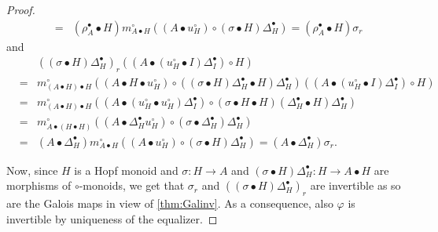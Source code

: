 \documentclass[nosumlimits,twoside]{amsart}
\theoremstyle{definition}
\theoremstyle{remark}
\begin{document}
\begin{proof}
\begin{eqnarray*}
&=&\left( \rho _{A}^{\bullet }\bullet H\right) m_{A\bullet H}^{\circ }\left(
\left( A\bullet u_{H}^{\circ }\right) \circ \left( \sigma \bullet H\right)
\Delta _{H}^{\bullet }\right)  =\left( \rho _{A}^{\bullet }\bullet H\right) \sigma _{r}
\end{eqnarray*}%
and
\begin{eqnarray*}
&&\left( \left( \sigma \bullet H\right) \Delta _{H}^{\bullet }\right)
_{r}\left( \left( A\bullet \left( u_{H}^{\circ }\bullet I\right) \Delta
_{I}^{\bullet }\right) \circ H\right)  \\
&=&m_{\left( A\bullet H\right) \bullet H}^{\circ }\left( \left( A\bullet
H\bullet u_{H}^{\circ }\right) \circ \left( \left( \sigma \bullet H\right)
\Delta _{H}^{\bullet }\bullet H\right) \Delta _{H}^{\bullet }\right) \left(
\left( A\bullet \left( u_{H}^{\circ }\bullet I\right) \Delta _{I}^{\bullet
}\right) \circ H\right)  \\
&=&m_{\left( A\bullet H\right) \bullet H}^{\circ }\left( \left( A\bullet
\left( u_{H}^{\circ }\bullet u_{H}^{\circ }\right) \Delta _{I}^{\bullet
}\right) \circ \left( \sigma \bullet H\bullet H\right) \left( \Delta
_{H}^{\bullet }\bullet H\right) \Delta _{H}^{\bullet }\right)  \\
&=&m_{A\bullet \left( H\bullet H\right) }^{\circ }\left( \left( A\bullet
\Delta _{H}^{\bullet }u_{H}^{\circ }\right) \circ \left( \sigma \bullet
\Delta _{H}^{\bullet }\right) \Delta _{H}^{\bullet }\right)  \\
&=&\left( A\bullet \Delta _{H}^{\bullet }\right) m_{A\bullet H}^{\circ
}\left( \left( A\bullet u_{H}^{\circ }\right) \circ \left( \sigma \bullet
H\right) \Delta _{H}^{\bullet }\right)  =\left( A\bullet \Delta _{H}^{\bullet }\right) \sigma _{r}.
\end{eqnarray*}

Now, since $H$ is a Hopf
monoid and $\sigma :H\rightarrow A$ and $\left( \sigma \bullet H\right)
\Delta _{H}^{\bullet }:H\rightarrow A\bullet H$ are morphisms of $\circ$-monoids, we
get that $\sigma _{r}$ and $\left( \left( \sigma \bullet H\right) \Delta
_{H}^{\bullet }\right) _{r}$ are invertible as so are the Galois maps in view of \cref{thm:Galinv}. As a consequence, also $\varphi $ is
invertible by uniqueness of the equalizer.


\end{proof}
\end{document}
